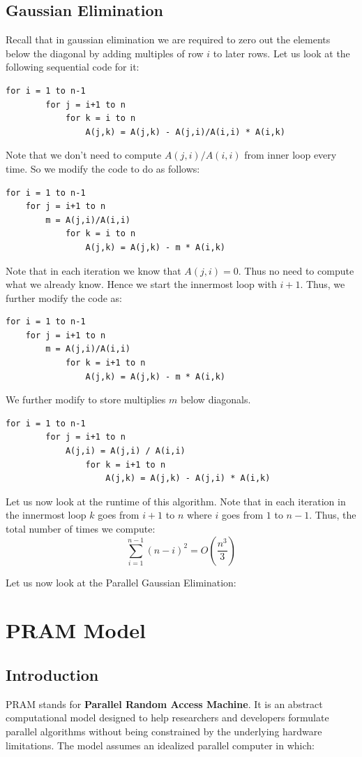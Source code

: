 \documentclass[12pt]{book}
\begin{document}
\section{Gaussian Elimination}
Recall that in gaussian elimination we are required to zero out the elements below the diagonal by adding multiples of row $i$ to later rows. Let us look at the following sequential code for it:
\begin{lstlisting}[style=cppstyle]
    for i = 1 to n-1
        for j = i+1 to n
            for k = i to n
                A(j,k) = A(j,k) - A(j,i)/A(i,i) * A(i,k)
\end{lstlisting}
Note that we don't need to compute $A(j,i)/A(i,i)$ from inner loop every time. So we modify the code to do as follows:
\begin{lstlisting}[style = cppstyle]
for i = 1 to n-1
    for j = i+1 to n
        m = A(j,i)/A(i,i)
            for k = i to n
                A(j,k) = A(j,k) - m * A(i,k)
\end{lstlisting}
Note that in each iteration we know that $A(j,i) = 0$. Thus no need to compute what we already know. Hence we start the innermost loop with $i+1$. Thus, we further modify the code as:
\begin{lstlisting}[style = cppstyle]
for i = 1 to n-1
    for j = i+1 to n
        m = A(j,i)/A(i,i)
            for k = i+1 to n
                A(j,k) = A(j,k) - m * A(i,k)
\end{lstlisting}
We further modify to store multiplies $m$ below diagonals.
\begin{lstlisting}[style = cppstyle]
    for i = 1 to n-1
        for j = i+1 to n
            A(j,i) = A(j,i) / A(i,i)
                for k = i+1 to n
                    A(j,k) = A(j,k) - A(j,i) * A(i,k)
\end{lstlisting}
Let us now look at the runtime of this algorithm. Note that in each iteration in the innermost loop $k$ goes from $i+1$ to $n$ where $i$ goes from $1$ to $n-1$. Thus, the total number of times we compute:
\[
\sum_{i=1}^{n-1} (n-i)^2 =  O\left(\frac{n^3}{3}\right) 
\]

Let us now look at the Parallel Gaussian Elimination:






\chapter{PRAM Model}

\section{Introduction}
PRAM stands for \textbf{Parallel Random Access Machine}. It is an abstract computational model designed to help researchers and developers formulate parallel algorithms without being constrained by the underlying hardware limitations. The model assumes an idealized parallel computer in which:
\end{document}

